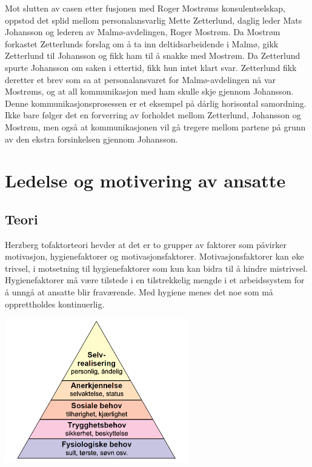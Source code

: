 \documentclass[norsk]{article}
\begin{document}
Mot slutten av casen etter fusjonen med Roger Mostrøms konsulentselskap, oppstod det splid mellom personalansvarlig Mette Zetterlund, daglig leder Mats Johansson og lederen av Malmø-avdelingen, Roger Mostrøm. Da Mostrøm forkastet Zetterlunds forslag om å ta inn deltidsarbeidende i Malmø, gikk Zetterlund til Johansson og fikk ham til å snakke med Mostrøm. Da Zetterlund spurte Johansson om saken i ettertid, fikk hun intet klart svar. Zetterlund fikk deretter et brev som sa at personalansvaret for Malmø-avdelingen nå var Mostrøms, og at all kommunikasjon med ham skulle skje gjennom Johansson. Denne kommunikasjonsprosessen er et eksempel på dårlig horisontal samordning. Ikke bare følger det en forverring av forholdet mellom Zetterlund, Johansson og Mostrøm, men også at kommunikasjonen vil gå tregere mellom partene på grunn av den ekstra forsinkelsen gjennom Johansson.  

\newpage
\section{Ledelse og motivering av ansatte}
\subsection{Teori}

Herzberg tofaktorteori hevder at det er to grupper av faktorer som påvirker motivasjon, hygienefaktorer og motivasjonsfaktorer. Motivasjonsfaktorer kan øke trivsel, i motsetning til hygienefaktorer som kun kan bidra til å hindre mistrivsel. Hygienefaktorer må være tilstede i en tilstrekkelig mengde i et arbeidssystem for å unngå at ansatte blir fraværende. Med hygiene menes det noe som må opprettholdes kontinuerlig.

\vspace{1cm}
\begin{center}
    {\includegraphics[width=0.6\textwidth, draft=false]{Vedlegg/maslows.jpg}}
\end{center}
\end{document}
